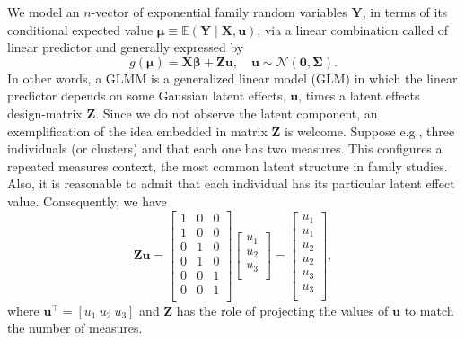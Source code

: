 We model an \(n\)-vector of exponential family random variables
\(\bm{Y}\), in terms of its conditional expected value
\(\bm{\mu} \equiv \mathbb{E}(\bm{Y} \mid \bm{X,u})\), via a linear
combination called of linear predictor and generally expressed by
\begin{equation}
 g(\bm{\mu}) = \bm{X\beta} + \bm{Zu}, \quad
 \bm{u} \sim \mathcal{N}(\bm{0,\Sigma}).
 \label{eq:gmu}
\end{equation}
In other words, a GLMM \cite{GLMM} is a generalized linear model (GLM)
in which the linear predictor depends on some Gaussian latent effects,
\(\bm{u}\), times a latent effects design-matrix \(\bm{Z}\). Since we do
not observe the latent component, an exemplification of the idea
embedded in matrix \(\bm{Z}\) is welcome. Suppose e.g., three
individuals (or clusters) and that each one has two measures. This
configures a repeated measures context, the most common latent structure
in family studies. Also, it is reasonable to admit that each individual
has its particular latent effect value. Consequently, we have
\[
 \bm{Zu} = \begin{bmatrix}
            1 & 0 & 0\\1 & 0 & 0\\
            0 & 1 & 0\\0 & 1 & 0\\
            0 & 0 & 1\\0 & 0 & 1\\
           \end{bmatrix} \begin{bmatrix}
                          u_{1}\\u_{2}\\u_{3}\\
                         \end{bmatrix} = \begin{bmatrix}
                                          u_{1}\\u_{1}\\
                                          u_{2}\\u_{2}\\
                                          u_{3}\\u_{3}\\
                                         \end{bmatrix},
\]
where \(\bm{u}^{\top} = [u_{1}~u_{2}~u_{3}]\) and \(\bm{Z}\) has the
role of projecting the values of \(\bm{u}\) to match the number of
measures.

